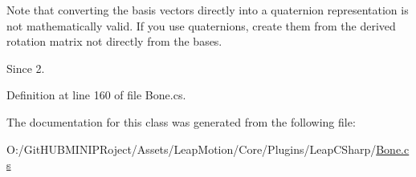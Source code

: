 Note that converting the basis vectors directly into a quaternion representation is not mathematically valid. If you use quaternions, create them from the derived rotation matrix not directly from the bases.

\begin{DoxySince}{Since}
2. 
\end{DoxySince}


Definition at line 160 of file Bone.\+cs.



The documentation for this class was generated from the following file\+:\begin{DoxyCompactItemize}
\item 
O\+:/\+Git\+H\+U\+B\+M\+I\+N\+I\+P\+Roject/\+Assets/\+Leap\+Motion/\+Core/\+Plugins/\+Leap\+C\+Sharp/\mbox{\hyperlink{_bone_8cs}{Bone.\+cs}}\end{DoxyCompactItemize}
